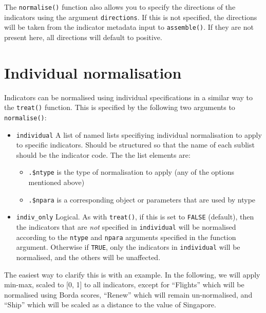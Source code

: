 \documentclass[
]{book}
\providecommand{\tightlist}{%
  \setlength{\itemsep}{0pt}\setlength{\parskip}{0pt}}
\begin{document}
The \texttt{normalise()} function also allows you to specify the directions of the indicators using the argument \texttt{directions}. If this is not specified, the directions will be taken from the indicator metadata input to \texttt{assemble()}. If they are not present here, all directions will default to positive.

\hypertarget{individual-normalisation}{%
\section{Individual normalisation}\label{individual-normalisation}}

Indicators can be normalised using individual specifications in a similar way to the \texttt{treat()} function. This is specified by the following two arguments to \texttt{normalise()}:

\begin{itemize}
\tightlist
\item
  \texttt{individual} A list of named lists specifiying individual normalisation to apply to specific indicators. Should be structured so that the name of each sublist should be the indicator code. The the list elements are:

  \begin{itemize}
  \tightlist
  \item
    \texttt{.\$ntype} is the type of normalisation to apply (any of the options mentioned above)
  \item
    \texttt{.\$npara} is a corresponding object or parameters that are used by ntype
  \end{itemize}
\item
  \texttt{indiv\_only} Logical. As with \texttt{treat()}, if this is set to \texttt{FALSE} (default), then the indicators that are \emph{not} specified in \texttt{individual} will be normalised according to the \texttt{ntype} and \texttt{npara} arguments specified in the function argument. Otherwise if \texttt{TRUE}, only the indicators in \texttt{individual} will be normalised, and the others will be unaffected.
\end{itemize}

The easiest way to clarify this is with an example. In the following, we will apply min-max, scaled to {[}0, 1{]} to all indicators, except for ``Flights'' which will be normalised using Borda scores, ``Renew'' which will remain un-normalised, and ``Ship'' which will be scaled as a distance to the value of Singapore.
\end{document}
